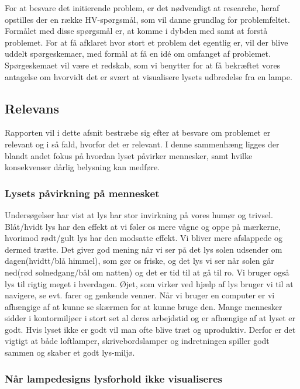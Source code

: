 For at besvare det initierende problem, er det nødvendigt at researche, heraf opstilles der en række HV-spørgsmål, som vil danne grundlag for problemfeltet. Formålet med disse spørgsmål er, at komme i dybden med samt at forstå problemet.  
For at få afklaret hvor stort et problem det egentlig er, vil der blive uddelt spørgeskemaer, med formål at få en idé om omfanget af problemet. 
Spørgeskemaet vil være et redskab, som vi benytter for at få bekræftet vores antagelse om hvorvidt det er svært at visualisere lysets udbredelse fra en lampe. 

\subsection{Relevans}
Rapporten vil i dette afsnit bestræbe sig efter at besvare om problemet er relevant og i så fald, hvorfor det er relevant. I denne sammenhæng ligges der blandt andet fokus på hvordan lyset påvirker mennesker, samt hvilke konsekvenser dårlig belysning kan medføre. 

\subsubsection{Lysets påvirkning på mennesket}

Undersøgelser har vist at lys har stor invirkning på vores humør og trivsel.
Blåt/hvidt lys har den effekt at vi føler os mere vågne og oppe på mærkerne\cite{videnskab_dk_paavirkning}, hvorimod rødt/gult lys har den modsatte effekt. Vi bliver mere afslappede og dermed trætte. Det giver god mening når vi ser på det lys solen udsender om dagen(hvidtt/blå himmel), som gør os friske, og det lys vi ser når solen går ned(rød solnedgang/bål om natten) og det er tid til at gå til ro. Vi bruger også lys til rigtig meget i hverdagen. Øjet, som virker ved hjælp af lys bruger vi til at navigere, se evt. farer og genkende venner. Når vi bruger en computer er vi afhængige af at kunne se skærmen for at kunne bruge den. Mange mennesker sidder i kontormiljøer i stort set al deres arbejdstid og er afhængige af at lyset er godt. Hvis lyset ikke er godt vil man ofte blive træt og uproduktiv. Derfor er det vigtigt at både loftlamper, skrivebordslamper og indretningen spiller godt sammen og skaber et godt lys-miljø.


\subsubsection{Når lampedesigns lysforhold ikke visualiseres}

